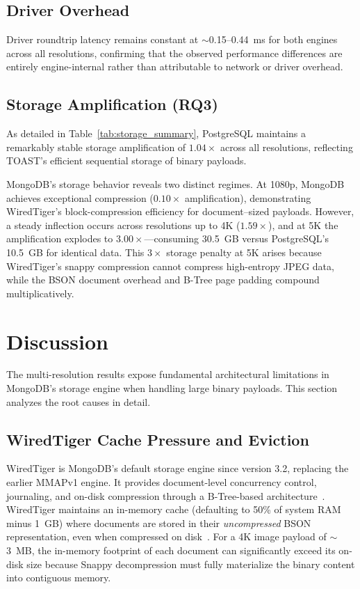 \documentclass[conference, a4paper]{IEEEtran}
\begin{document}
\subsection{Driver Overhead}
\label{subsec:driver_overhead}
Driver roundtrip latency remains constant at $\sim$0.15--0.44~ms for both engines across all resolutions, confirming that the observed performance differences are entirely engine-internal rather than attributable to network or driver overhead.


\subsection{Storage Amplification (RQ3)}
\label{subsec:storage_size}
As detailed in Table~\ref{tab:storage_summary}, PostgreSQL maintains a remarkably stable storage amplification of $1.04\times$ across all resolutions, reflecting TOAST's efficient sequential storage of binary payloads.

MongoDB's storage behavior reveals two distinct regimes. At 1080p, MongoDB achieves exceptional compression ($0.10\times$ amplification), demonstrating WiredTiger's block-compression efficiency for document--sized payloads. However, a steady inflection occurs across resolutions up to 4K ($1.59\times$), and at 5K the amplification explodes to $3.00\times$---consuming 30.5~GB versus PostgreSQL's 10.5~GB for identical data. This $3\times$ storage penalty at 5K arises because WiredTiger's snappy compression cannot compress high-entropy JPEG data, while the BSON document overhead and B-Tree page padding compound multiplicatively.


\section{Discussion}
\label{sec:discussion}

The multi-resolution results expose fundamental architectural limitations in MongoDB's storage engine when handling large binary payloads. This section analyzes the root causes in detail.

\subsection{WiredTiger Cache Pressure and Eviction}
WiredTiger is MongoDB's default storage engine since version 3.2, replacing the earlier MMAPv1 engine. It provides document-level concurrency control, journaling, and on-disk compression through a B-Tree-based architecture~\cite{mongodb_wiredtiger_storage}. WiredTiger maintains an in-memory cache (defaulting to 50\% of system RAM minus 1~GB) where documents are stored in their \emph{uncompressed} BSON representation, even when compressed on disk~\cite{mongodb_wiredtiger_storage}. For a 4K image payload of $\sim$3~MB, the in-memory footprint of each document can significantly exceed its on-disk size because Snappy decompression must fully materialize the binary content into contiguous memory.
\end{document}
